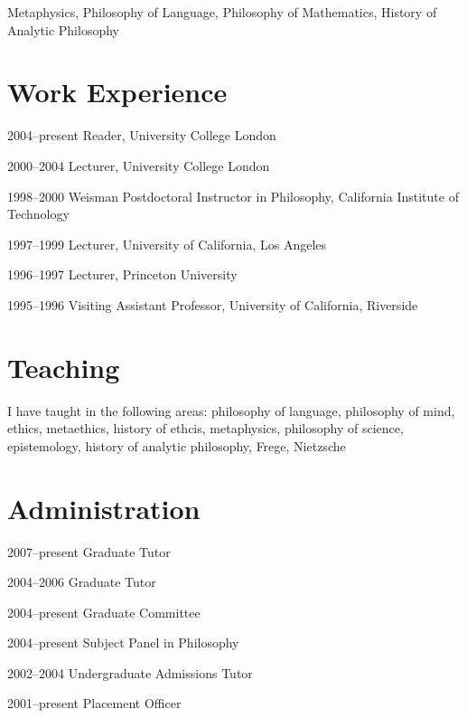 \documentclass[contbibnum]{cv}
\begin{document}
\begin{topic}
    \item Metaphysics, Philosophy of Language, Philosophy of Mathematics, History of Analytic Philosophy
\end{topic}


\section{Work Experience}\label{sec:work_experience} %

\begin{topic}
\item[2004--present] Reader, University College London
\item[2000--2004] Lecturer, University College London
\item[1998--2000] Weisman Postdoctoral Instructor in Philosophy, California Institute of Technology
\item[1997--1999] Lecturer, University of California, Los Angeles
\item[1996--1997] Lecturer, Princeton University
\item[1995--1996] Visiting Assistant Professor, University of California, Riverside
\end{topic}


\section{Teaching}\label{sec:teaching} %

\begin{topic}
    \item I have taught in the following areas: philosophy of language, philosophy of mind, ethics, metaethics, history of ethcis, metaphysics, philosophy of science, epistemology, history of analytic philosophy, Frege, Nietzsche
\end{topic}


\section{Administration}\label{sec:administration} %

\begin{topic}
    \item[2007--present] Graduate Tutor
    \item[2004--2006] Graduate Tutor
    \item[2004--present] Graduate Committee
    \item[2004--present] Subject Panel in Philosophy
    \item[2002--2004] Undergraduate Admissions Tutor
    \item[2001--present] Placement Officer
\end{topic}
\end{document}
